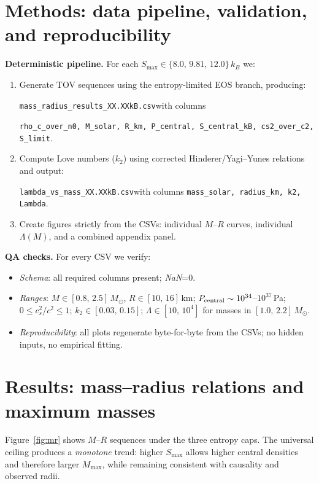 \documentclass[11pt]{article}
\begin{document}
\section{Methods: data pipeline, validation, and reproducibility}
\label{sec:methods}
\textbf{Deterministic pipeline.} For each $S_{\max}\in\{8.0,\,9.81,\,12.0\}\,k_B$ we:
\begin{enumerate}[leftmargin=1.5em]
\item Generate TOV sequences using the entropy-limited EOS branch, producing:
\begin{center}\small
\verb|mass_radius_results_XX.XXkB.csv|\quad with columns\\
\rule{0pt}{1.2em}\verb|rho_c_over_n0, M_solar, R_km, P_central, S_central_kB, cs2_over_c2, S_limit|.
\end{center}
\item Compute Love numbers ($k_2$) using corrected Hinderer/Yagi–Yunes relations \cite{Hinderer2008,FlanaganHinderer2008,YagiYunes2013,YagiYunes2017} and output:
\begin{center}\small
\verb|lambda_vs_mass_XX.XXkB.csv|\quad with columns \verb|mass_solar, radius_km, k2, Lambda|.
\end{center}
\item Create figures strictly from the CSVs: individual $M$–$R$ curves, individual $\Lambda(M)$, and a combined appendix panel.
\end{enumerate}

\noindent\textbf{QA checks.} For every CSV we verify:
\begin{itemize}[leftmargin=1.2em]
\item \emph{Schema}: all required columns present; \emph{NaN}=0.
\item \emph{Ranges}: $M\in[0.8,\,2.5]\,M_\odot$, $R\in[10,\,16]$\,km; $P_{\rm central}\sim10^{34}$–$10^{37}$\,Pa; $0\le c_s^2/c^2\le1$; $k_2\in[0.03,\,0.15]$; $\Lambda\in[10,\,10^4]$ for masses in $[1.0,\,2.2]\,M_\odot$.
\item \emph{Reproducibility}: all plots regenerate byte-for-byte from the CSVs; no hidden inputs, no empirical fitting.
\end{itemize}

\section{Results: mass–radius relations and maximum masses}
\label{sec:mr}
Figure~\ref{fig:mr} shows $M$–$R$ sequences under the three entropy caps. The universal ceiling produces a \emph{monotone} trend: higher $S_{\max}$ allows higher central densities and therefore larger $M_{\max}$, while remaining consistent with causality and observed radii.
\end{document}
